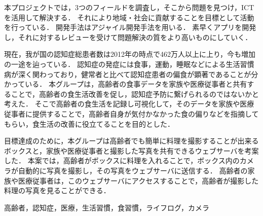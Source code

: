 \documentclass[../report]{subfiles}
\begin{document}
\begin{jabstract}
本プロジェクトでは，3つのフィールドを調査し，そこから問題を見つけ，ICTを活用して解決する．
それにより地域・社会に貢献することを目標として活動を行っている．
開発手法はアジャイル開発手法を用いる．
素早くアプリを開発し，それに対するレビューを受けて問題解決の質をより高いものにしていく．

現在，我が国の認知症総患者数は2012年の時点で462万人以上に上り，今も増加の一途を辿っている\cite{zouka}．
認知症の発症には食事，運動，睡眠などによる生活習慣病が深く関わっており，健常者と比べて認知症患者の偏食が顕著であることが分かっている\cite{ueki}．
本グループは，高齢者の食事データを家族や医療従事者と共有することで，高齢者の食生活改善を促し，認知症予防に繋げられるのではないかと考えた．
そこで高齢者の食生活を記録し可視化して，そのデータを家族や医療従事者に提供することで，高齢者自身が気付かなかった食の偏りなどを指摘してもらい，食生活の改善に役立てることを目的とした．

目標達成のために，本グループは高齢者でも簡単に料理を撮影することが出来るボックスと，家族や医療従事者と撮影した写真を共有できるウェブサーバを考案した．
本案では，高齢者がボックスに料理を入れることで，ボックス内のカメラが自動的に写真を撮影し，その写真をウェブサーバに送信する．
高齢者の家族や医療従事者は，このウェブサーバにアクセスすることで，高齢者が撮影した料理の写真を見ることができる．
\begin{jkeyword}
高齢者，認知症，医療，生活習慣，食習慣，ライフログ，カメラ
\end{jkeyword}
\end{jabstract}
\end{document}
